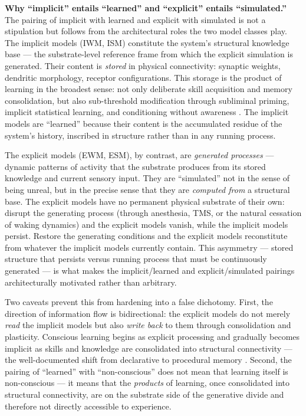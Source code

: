 \documentclass[12pt]{article}
\newcommand{\revstart}{}
\begin{document}
{\revstart\textbf{Why ``implicit'' entails ``learned'' and ``explicit'' entails ``simulated.''} The pairing of implicit with learned and explicit with simulated is not a stipulation but follows from the architectural roles the two model classes play. The implicit models (IWM, ISM) constitute the system's structural knowledge base --- the substrate-level reference frame from which the explicit simulation is generated. Their content is \emph{stored} in physical connectivity: synaptic weights, dendritic morphology, receptor configurations. This storage is the product of learning in the broadest sense: not only deliberate skill acquisition and memory consolidation, but also sub-threshold modification through subliminal priming, implicit statistical learning, and conditioning without awareness \citep{Reber1967,FiserAslin2001,OhmanMineka2001}. The implicit models are ``learned'' because their content is the accumulated residue of the system's history, inscribed in structure rather than in any running process.

The explicit models (EWM, ESM), by contrast, are \emph{generated processes} --- dynamic patterns of activity that the substrate produces from its stored knowledge and current sensory input. They are ``simulated'' not in the sense of being unreal, but in the precise sense that they are \emph{computed from} a structural base. The explicit models have no permanent physical substrate of their own: disrupt the generating process (through anesthesia, TMS, or the natural cessation of waking dynamics) and the explicit models vanish, while the implicit models persist. Restore the generating conditions and the explicit models reconstitute from whatever the implicit models currently contain. This asymmetry --- stored structure that persists versus running process that must be continuously generated --- is what makes the implicit/learned and explicit/simulated pairings architecturally motivated rather than arbitrary.

Two caveats prevent this from hardening into a false dichotomy. First, the direction of information flow is bidirectional: the explicit models do not merely \emph{read} the implicit models but also \emph{write back} to them through consolidation and plasticity. Conscious learning begins as explicit processing and gradually becomes implicit as skills and knowledge are consolidated into structural connectivity --- the well-documented shift from declarative to procedural memory \citep{Squire2004}. Second, the pairing of ``learned'' with ``non-conscious'' does not mean that learning itself is non-conscious --- it means that the \emph{products} of learning, once consolidated into structural connectivity, are on the substrate side of the generative divide and therefore not directly accessible to experience.

}
\end{document}
